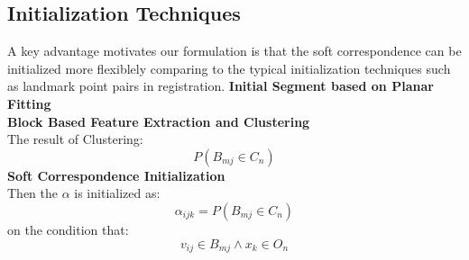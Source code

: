 \subsection{Initialization Techniques}
A key advantage motivates our formulation is that the soft correspondence can be initialized more flexiblely comparing to the typical initialization techniques such as landmark point pairs in registration.
\textbf{Initial Segment based on Planar Fitting}\\
\textbf{Block Based Feature Extraction and Clustering}\\
The result of Clustering:
$$P(B_{mj} \in C_n)$$
\textbf{Soft Correspondence Initialization}\\
Then the $\alpha$ is initialized as:
$$\alpha_{ijk}=P(B_{mj} \in C_n)$$
on the condition that:
$$v_{ij} \in B_{mj} \wedge x_k \in O_n$$